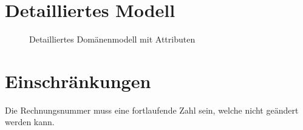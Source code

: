 \documentclass[a4paper,12pt,twoside]{scrreprt}
\begin{document}
    \section{Detailliertes Modell}
    \begin{figure}[ht!]
        \begin{center}
            \caption{Detailliertes Domänenmodell mit Attributen}\label{domainmodel_detail}
        \end{center}
    \end{figure}

    
    
    
    
    

    
    
    
    
    
    
    
    
    
    
    


    \section{Einschränkungen}
    Die Rechnungsnummer muss eine fortlaufende Zahl sein, welche nicht geändert werden kann.
\end{document}
